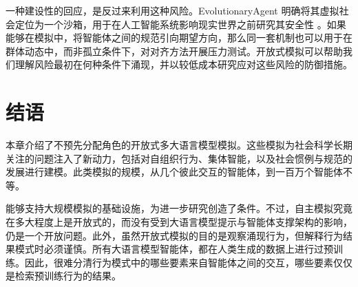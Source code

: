 一种建设性的回应，是反过来利用这种风险。EvolutionaryAgent 明确将其虚拟社会定位为一个沙箱，用于在人工智能系统影响现实世界之前研究其安全性 \citep{li2024agent}。如果能够在模拟中，将智能体之间的规范引向期望方向，那么同一套机制也可以用于在群体动态中，而非孤立条件下，对对齐方法开展压力测试。开放式模拟可以帮助我们理解风险最初在何种条件下涌现，并以较低成本研究应对这些风险的防御措施。

\section{结语}
本章介绍了不预先分配角色的开放式多大语言模型模拟。这些模拟为社会科学长期关注的问题注入了新动力，包括对自组织行为、集体智能，以及社会惯例与规范的发展进行建模。此类模拟的规模，从几个彼此交互的智能体，到一百万个智能体不等。

能够支持大规模模拟的基础设施，为进一步研究创造了条件。不过，自主模拟究竟在多大程度上是开放式的，而没有受到大语言模型提示与智能体支撑架构的影响，仍是一个开放问题。此外，虽然开放式模拟的目的是观察涌现行为，但解释行为结果模式时必须谨慎。所有大语言模型智能体，都在人类生成的数据上进行过预训练。因此，很难分清行为模式中的哪些要素来自智能体之间的交互，哪些要素仅仅是检索预训练行为的结果。



